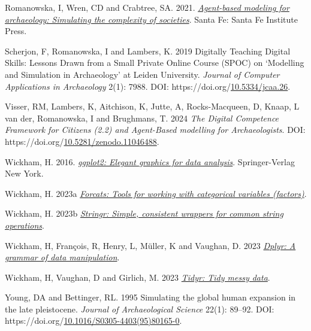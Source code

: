 \documentclass[
]{article}
\newlength{\cslhangindent}
\newlength{\cslentryspacingunit} %
\newenvironment{CSLReferences}[2] %
 {%
  \setlength{\parindent}{0pt}
  \ifodd #1
  \let\oldpar\par
  \def\par{\hangindent=\cslhangindent\oldpar}
  \fi
  \setlength{\parskip}{#2\cslentryspacingunit}
 }%
 {}
\begin{document}
\begin{CSLReferences}{1}{0}
\leavevmode{}%
Romanowska, I, Wren, CD and Crabtree, SA. 2021. \emph{\href{https://www.sfipress.org/books/agent-based-modeling-archaeology}{Agent-based modeling for archaeology: Simulating the complexity of societies}}. Santa Fe: Santa Fe Institute Press.

\leavevmode{}%
Scherjon, F, Romanowska, I and Lambers, K. 2019 Digitally Teaching Digital Skills: Lessons Drawn from a Small Private Online Course (SPOC) on {`}Modelling and Simulation in Archaeology{'} at Leiden University. \emph{Journal of Computer Applications in Archaeology} 2(1): 7988. DOI: https://doi.org/\href{https://doi.org/10.5334/jcaa.26}{10.5334/jcaa.26}.

\leavevmode{}%
Visser, RM, Lambers, K, Aitchison, K, Jutte, A, Rocks-Macqueen, D, Knaap, L van der, Romanowska, I and Brughmans, T. 2024 \emph{The Digital Competence Framework for Citizens (2.2) and Agent-Based modelling for Archaeologists}. DOI: https://doi.org/\href{https://doi.org/10.5281/zenodo.11046488}{10.5281/zenodo.11046488}.

\leavevmode{}%
Wickham, H. 2016. \emph{\href{http://ggplot2.org}{ggplot2: Elegant graphics for data analysis}}. Springer-Verlag New York.

\leavevmode{}%
Wickham, H. 2023a \emph{\href{https://forcats.tidyverse.org/}{Forcats: Tools for working with categorical variables (factors)}}.

\leavevmode{}%
Wickham, H. 2023b \emph{\href{https://stringr.tidyverse.org}{Stringr: Simple, consistent wrappers for common string operations}}.

\leavevmode{}%
Wickham, H, François, R, Henry, L, Müller, K and Vaughan, D. 2023 \emph{\href{https://dplyr.tidyverse.org}{Dplyr: A grammar of data manipulation}}.

\leavevmode{}%
Wickham, H, Vaughan, D and Girlich, M. 2023 \emph{\href{https://tidyr.tidyverse.org}{Tidyr: Tidy messy data}}.

\leavevmode{}%
Young, DA and Bettinger, RL. 1995 Simulating the global human expansion in the late pleistocene. \emph{Journal of Archaeological Science} 22(1): 89--92. DOI: https://doi.org/\href{https://doi.org/10.1016/S0305-4403(95)80165-0}{10.1016/S0305-4403(95)80165-0}.

\end{CSLReferences}
\end{document}
